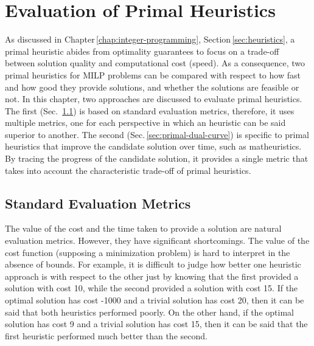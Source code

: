 

\chapter{Evaluation of Primal Heuristics}\label{chap:evaluation}

As discussed in Chapter\,\ref{chap:integer-programming}, Section\,\ref{sec:heuristics}, a primal heuristic abides from optimality guarantees to focus on a trade-off between solution quality and computational cost (speed).
As a consequence, two primal heuristics for MILP problems can be compared with respect to how fast and how good they provide solutions, and whether the solutions are feasible or not.
In this chapter, two approaches are discussed to evaluate primal heuristics.
The first (Sec.~\ref{sec:standard-evaluation-metrics}) is based on standard evaluation metrics, therefore, it uses multiple metrics, one for each perspective in which an heuristic can be said superior to another.
The second (Sec.\,\ref{sec:primal-dual-curve}) is specific to primal heuristics that improve the candidate solution over time, such as matheuristics.
By tracing the progress of the candidate solution, it provides a single metric that takes into account the characteristic trade-off of primal heuristics.


\section{Standard Evaluation Metrics}\label{sec:standard-evaluation-metrics}

The value of the cost and the time taken to provide a solution are natural evaluation metrics.
However, they have significant shortcomings.
The value of the cost function (supposing a minimization problem) is hard to interpret in the absence of bounds.
For example, it is difficult to judge how better one heuristic approach is with respect to the other just by knowing that the first provided a solution with cost 10, while the second provided a solution with cost 15.
If the optimal solution has cost -1000 and a trivial solution has cost 20, then it can be said that both heuristics performed poorly.
On the other hand, if the optimal solution has cost 9 and a trivial solution has cost 15, then it can be said that the first heuristic performed much better than the second.

